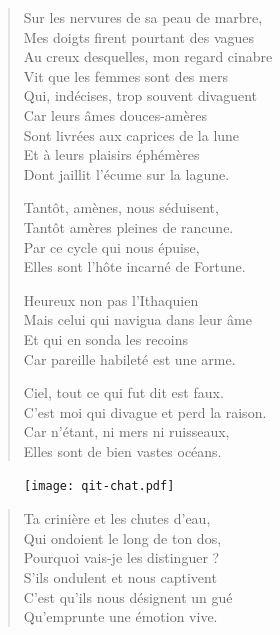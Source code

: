 \begin{verse}
Sur les nervures de sa peau de marbre,\\
Mes doigts firent pourtant des vagues\\
Au creux desquelles, mon regard cinabre\\
Vit que les femmes sont des mers\\
Qui, indécises, trop souvent divaguent\\
Car leurs âmes douces-amères\\
Sont livrées aux caprices de la lune\\
Et à leurs plaisirs éphémères\\
Dont jaillit l’écume sur la lagune.

Tantôt, amènes, nous séduisent,\\
Tantôt amères pleines de rancune.\\
Par ce cycle qui nous épuise,\\
Elles sont l’hôte incarné de Fortune.

Heureux non pas l’Ithaquien\label{foot.ithaquien}\\
Mais celui qui navigua dans leur âme\\
Et qui en sonda les recoins\\
Car pareille habileté est une arme.

Ciel, tout ce qui fut dit est faux.\\
C’est moi qui divague et perd la raison.\\
Car n’étant, ni mers ni ruisseaux,\\
Elles sont de bien vastes océans.
\end{verse}

\begin{figure}[h]
\centering
\texttt{[image: qit-chat.pdf]}
\captionsetup{labelformat=empty}
\caption[Idéotexte du  (\textarabic{قط})]{}
\end{figure}



\begin{verse}
Ta crinière et les chutes d’eau,\\
Qui ondoient le long de ton dos,\\
Pourquoi vais-je les distinguer ?\\
S’ils ondulent et nous captivent\\
C’est qu’ils nous désignent un gué\\
Qu’emprunte une émotion vive.
\end{verse}

